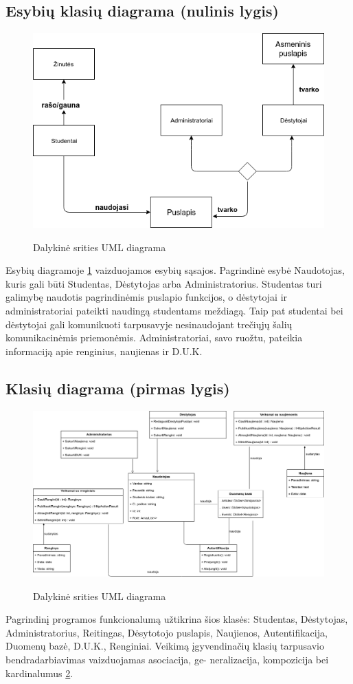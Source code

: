 \documentclass{VUMIFPSkursinis}
\begin{document}
\subsection{Esybių klasių diagrama (nulinis lygis)}
\begin{figure}[H]
\centering
\includegraphics[width=\linewidth]{img/dalykine.png}
\label{fig:dalykine}
\caption{Dalykinė srities UML diagrama}
\end{figure}
Esybių diagramoje \ref{fig:dalykine} vaizduojamos esybių sąsajos. Pagrindinė esybė Naudotojas,
kuris gali būti Studentas, Dėstytojas arba Administratorius. Studentas turi galimybę naudotis pagrindinėmis puslapio funkcijos, o dėstytojai ir administratoriai pateikti naudingą studentams meždiagą. Taip pat studentai bei dėstytojai gali komunikuoti tarpusavyje nesinaudojant trečiųjų šalių komunikacinėmis priemonėmis. Administratoriai, savo ruožtu, pateikia informaciją apie renginius, naujienas ir D.U.K.
\subsection{Klasių diagrama (pirmas lygis)}
\begin{figure}[H]
\centering
\includegraphics[width=\linewidth]{img/pagrindine.png}
\label{fig:pagrindine}
\caption{Dalykinė srities UML diagrama}
\end{figure}
Pagrindinį programos funkcionalumą užtikrina šios klasės: Studentas, Dėstytojas, Administratorius, Reitingas, Dėsytotojo puslapis, Naujienos, Autentifikacija, Duomenų bazė,
D.U.K., Renginiai. Veikimą įgyvendinačių klasių tarpusavio bendradarbiavimas vaizduojamas asociacija, ge-
neralizacija, kompozicija bei kardinalumus \ref{fig:pagrindine}.
\newpage
\end{document}
